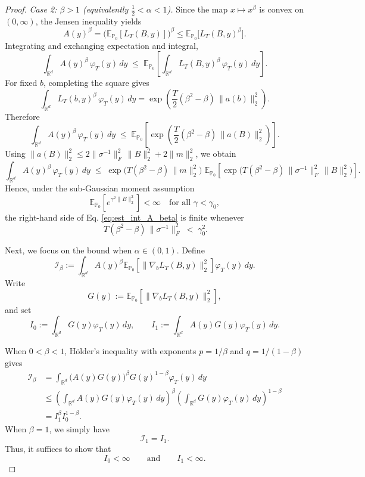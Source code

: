 \documentclass[10pt,a4paper]{amsart}
\newcommand{\E}{\mathbb{E}}
\newcommand{\R}{\mathbb{R}}
\begin{document}
\begin{proof}
\medskip
\noindent\emph{Case 2: $\beta>1$ (equivalently $\tfrac12<\alpha<1$).}
Since the map $x\mapsto x^{\beta}$ is convex on $(0,\infty)$, the Jensen inequality yields
\[
A(y)^{\beta}=\big(\E_{\mathbb{P}_0}[L_T(B,y)]\big)^{\beta}\le \E_{\mathbb{P}_0}\big[L_T(B,y)^{\beta}\big].
\]
Integrating and exchanging expectation and integral,
\[
\int_{\R^d} A(y)^{\beta}\,\varphi_T(y)\,dy
\;\le\;
\E_{\mathbb{P}_0}\!\left[\int_{\R^d} L_T(B,y)^{\beta}\,\varphi_T(y)\,dy\right].
\]
For fixed $b$, completing the square gives
\[
\int_{\R^d} L_T(b,y)^{\beta}\,\varphi_T(y)\,dy
=\exp\!\left(\frac{T}{2}(\beta^2-\beta)\,\|a(b)\|_2^2\right).
\]
Therefore
\[
\int_{\R^d} A(y)^{\beta}\,\varphi_T(y)\,dy
\;\le\;
\E_{\mathbb{P}_0}\!\left[\exp\!\left(\frac{T}{2}(\beta^2-\beta)\,\|a(B)\|_2^2\right)\right].
\]
Using $\|a(B)\|_2^2\le 2\|\sigma^{-1}\|_F^2\,\|B\|_2^2+2\|m\|_2^2$, we obtain
\begin{equation}\label{eq:est_int_A_beta}
\int_{\R^d} A(y)^{\beta}\,\varphi_T(y)\,dy
\;\le\;
\exp\!\Big(T(\beta^2-\beta)\,\|m\|_2^2\Big)\;
\E_{\mathbb{P}_0}\!\left[\exp\!\Big(T(\beta^2-\beta)\,\|\sigma^{-1}\|_F^2\,\|B\|_2^2\Big)\right].
\end{equation}
Hence, under the sub-Gaussian moment assumption
\[
\E_{\mathbb{P}_0}\!\left[e^{\gamma^2\|B\|_2^2}\right]<\infty\quad\text{for all }\gamma<\gamma_0,
\]
the right-hand side of Eq. \eqref{eq:est_int_A_beta} is finite whenever
\begin{equation}\label{eq:easy-threshold}
\ T(\beta^2-\beta)\,\|\sigma^{-1}\|_F^2 \;<\; \gamma_0^2.
\end{equation}

Next, we focus on the bound when $\alpha\in(0,1)$. Define
\[
\mathcal I_\beta
:=
\int_{\R^d}
A(y)^\beta
\E_{\mathbb P_0}
\left[
\|\nabla_bL_T(B,y)\|_2^2
\right]
\varphi_T(y)\,dy.
\]
Write
\[
G(y)
:=
\E_{\mathbb P_0}
\left[
\|\nabla_bL_T(B,y)\|_2^2
\right],
\]
and set
\[
I_0
:=
\int_{\R^d}G(y)\varphi_T(y)\,dy,
\qquad
I_1
:=
\int_{\R^d}A(y)G(y)\varphi_T(y)\,dy.
\]

When $0<\beta<1$, H\"older's inequality with exponents
$p=1/\beta$ and $q=1/(1-\beta)$ gives
\begin{equation}\label{eq:Ibeta-interpolate}
\begin{aligned}
\mathcal I_\beta
&=
\int_{\R^d}
\bigl(A(y)G(y)\bigr)^\beta
G(y)^{1-\beta}
\varphi_T(y)\,dy \\
&\leq
\left(
\int_{\R^d}A(y)G(y)\varphi_T(y)\,dy
\right)^\beta
\left(
\int_{\R^d}G(y)\varphi_T(y)\,dy
\right)^{1-\beta} \\
&=
I_1^\beta I_0^{1-\beta}.
\end{aligned}
\end{equation}
When $\beta=1$, we simply have
\[
\mathcal I_1=I_1.
\]
Thus, it suffices to show that
\[
I_0<\infty
\qquad\text{and}\qquad
I_1<\infty.
\]


\end{proof}
\end{document}
